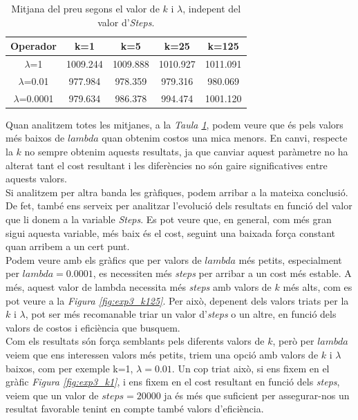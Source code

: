 \documentclass[a4paper]{article}
\begin{document}
	\begin{table}[H]
		\centering
		\begin{tabular}{|c|c|c|c|c|}
			\hline
			\textbf{Operador} & \textbf{k=1} & \textbf{k=5} & \textbf{k=25} & \textbf{k=125} \\
			\hline
			$\lambda$=1 & 1009.244 & 1009.888 & 1010.927 & 1011.091 \\
			\hline
			$\lambda$=0.01 & 977.984 & 978.359 & 979.316 & 980.069 \\
			\hline
			$\lambda$=0.0001 & 979.634 & 986.378 & 994.474 & 1001.120 \\
			\hline
		\end{tabular}
		\caption{Mitjana del preu segons el valor de $k$ i $\lambda$, indepent del valor d'\textit{Steps}.}
		\label{tab:exp3_estadisticas}
	\end{table}

	Quan analitzem totes les mitjanes, a la \textit{Taula \ref{tab:exp3_estadisticas}}, podem veure que és pels valors més baixos de $lambda$ quan obtenim costos una mica menors. En canvi, respecte la $k$ no sempre obtenim aquests resultats, ja que canviar aquest paràmetre no ha alterat tant el cost resultant i les diferències no són gaire significatives entre aquests valors. \\

	Si analitzem per altra banda les gràfiques, podem arribar a la mateixa conclusió. De fet, també ens serveix per analitzar l'evolució dels resultats en funció del valor que li donem a la variable \textit{Steps}. Es pot veure que, en general, com més gran sigui aquesta variable, més baix és el cost, seguint una baixada força constant quan arribem a un cert punt. \\
	
	Podem veure amb els gràfics que per valors de $lambda$ més petits, especialment per $lambda=0.0001$, es necessiten més \textit{steps} per arribar a un cost més estable. A més, aquest valor de lambda necessita més \textit{steps} amb valors de $k$ més alts, com es pot veure a la \textit{Figura \ref{fig:exp3_k125}}. Per això, depenent dels valors triats per la $k$ i $\lambda$, pot ser més recomanable triar un valor d'\textit{steps} o un altre, en funció dels valors de costos i eficiència que busquem. \\

	Com els resultats són força semblants pels diferents valors de $k$, però per $lambda$ veiem que ens interessen valors més petits, triem una opció amb valors de $k$ i $\lambda$ baixos, com per exemple k=1, $\lambda=0.01$. Un cop triat això, si ens fixem en el gràfic \textit{Figura \ref{fig:exp3_k1}}, i ens fixem en el cost resultant en funció dels \textit{steps}, veiem que un valor de $steps=20000$ ja és més que suficient per assegurar-nos un resultat favorable tenint en compte també valors d'eficiència. \\
		
\end{document}
